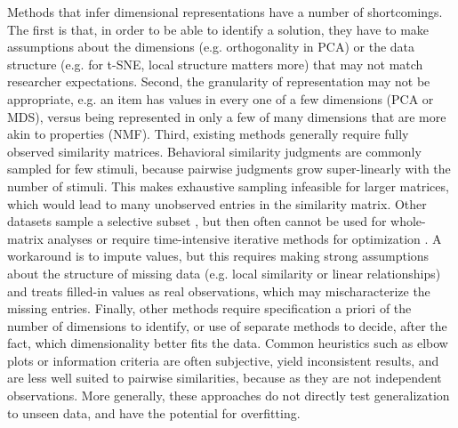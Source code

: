 \documentclass{article}
\begin{document}
Methods that infer dimensional representations have a number of shortcomings. The first is that, in order to be able to identify a solution, they have to make assumptions about the dimensions (e.g. orthogonality in PCA) or the data structure (e.g. for t-SNE, local structure matters more) that may not match researcher expectations. Second, the granularity of representation may not be appropriate, e.g. an item has values in every one of a few dimensions (PCA or MDS), versus being represented in only a few of many dimensions that are more akin to properties (NMF). Third, existing methods generally require fully observed similarity matrices. Behavioral similarity judgments are commonly sampled for few stimuli, because pairwise judgments grow super-linearly with the number of stimuli. This makes exhaustive sampling infeasible for larger matrices, which would lead to many unobserved entries in the similarity matrix. Other datasets sample a selective subset \citep{DeDeyne2019,Hebart2020}, but then often cannot be used for whole-matrix analyses or require time-intensive iterative methods for optimization \citep{Zheng2019}. A workaround is to impute values, but this requires making strong assumptions about the structure of missing data (e.g. local similarity or linear relationships) and treats filled-in values as real observations, which may mischaracterize the missing entries. Finally, other methods require specification a priori of the number of dimensions to identify, or use of separate methods to decide, after the fact, which dimensionality better fits the data. Common heuristics such as elbow plots or information criteria are often subjective, yield inconsistent results, and are less well suited to pairwise similarities, because as they are not independent observations. More generally, these approaches do not directly test generalization to unseen data, and have the potential for overfitting.

\end{document}
